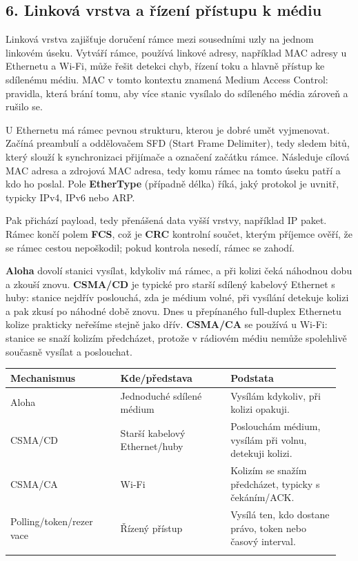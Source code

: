 \subsection*{6. Linková vrstva a řízení přístupu k médiu}

Linková vrstva zajišťuje doručení rámce mezi sousedními uzly na jednom linkovém úseku. Vytváří rámce, používá linkové adresy, například MAC adresy u Ethernetu a Wi-Fi, může řešit detekci chyb, řízení toku a hlavně přístup ke sdílenému médiu. MAC v tomto kontextu znamená Medium Access Control: pravidla, která brání tomu, aby více stanic vysílalo do sdíleného média zároveň a rušilo se.

U Ethernetu má rámec pevnou strukturu, kterou je dobré umět vyjmenovat. Začíná preambulí a oddělovačem SFD (Start Frame Delimiter), tedy sledem bitů, který slouží k synchronizaci přijímače a označení začátku rámce. Následuje cílová MAC adresa a zdrojová MAC adresa, tedy komu rámec na tomto úseku patří a kdo ho poslal. Pole \textbf{EtherType} (případně délka) říká, jaký protokol je uvnitř, typicky IPv4, IPv6 nebo ARP.

Pak přichází payload, tedy přenášená data vyšší vrstvy, například IP paket. Rámec končí polem \textbf{FCS}, což je \textbf{CRC} kontrolní součet, kterým příjemce ověří, že se rámec cestou nepoškodil; pokud kontrola nesedí, rámec se zahodí.

\textbf{Aloha} dovolí stanici vysílat, kdykoliv má rámec, a při kolizi čeká náhodnou dobu a zkouší znovu. \textbf{CSMA/CD} je typické pro starší sdílený kabelový Ethernet s huby: stanice nejdřív poslouchá, zda je médium volné, při vysílání detekuje kolizi a pak zkusí po náhodné době znovu. Dnes u přepínaného full-duplex Ethernetu kolize prakticky neřešíme stejně jako dřív. \textbf{CSMA/CA} se používá u Wi-Fi: stanice se snaží kolizím předcházet, protože v rádiovém médiu nemůže spolehlivě současně vysílat a poslouchat.

\begin{longtable}{p{0.317\linewidth}p{0.317\linewidth}p{0.317\linewidth}}
\toprule
\textbf{Mechanismus} & \textbf{Kde/představa} & \textbf{Podstata} \\
\midrule\endhead
Aloha & Jednoduché sdílené médium & Vysílám kdykoliv, při kolizi opakuji. \\
\addlinespace
CSMA/CD & Starší kabelový Ethernet/huby & Poslouchám médium, vysílám při volnu, detekuji kolizi. \\
\addlinespace
CSMA/CA & Wi-Fi & Kolizím se snažím předcházet, typicky s čekáním/ACK. \\
\addlinespace
Polling/token/rezer vace & Řízený přístup & Vysílá ten, kdo dostane právo, token nebo časový interval. \\
\addlinespace
\bottomrule
\end{longtable}

